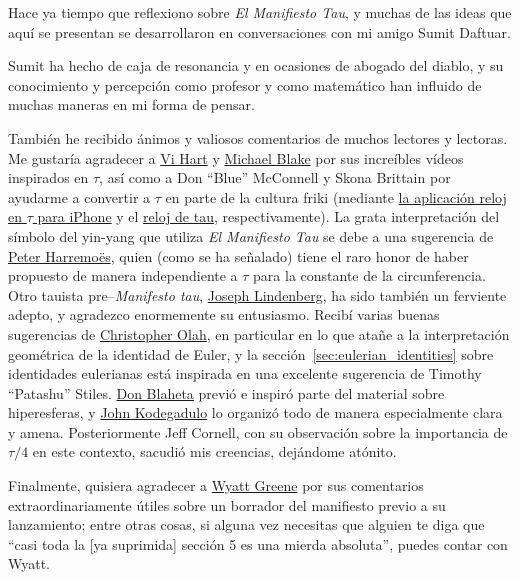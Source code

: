 Hace ya tiempo que reflexiono sobre \emph{El Manifiesto Tau}, y muchas de las ideas que aquí se presentan se desarrollaron en conversaciones con mi amigo Sumit Daftuar.

Sumit ha hecho de caja de resonancia y en ocasiones de abogado del diablo, y su conocimiento y percepción como profesor y como matemático han influido de muchas maneras en mi forma de pensar.

También he recibido ánimos y valiosos comentarios de muchos lectores y lectoras. Me gustaría agradecer a \href{http://www.youtube.com/watch?v=jG7vhMMXagQ}{Vi Hart} y \href{http://www.youtube.com/watch?v=3174T-3-59Q}{Michael Blake} por sus increíbles vídeos inspirados en $\tau$, así como a Don ``Blue'' McConnell y Skona Brittain por ayudarme a convertir a $\tau$ en parte de la cultura friki (mediante \href{http://tauclock.com/}{la aplicación reloj en $\tau$ para iPhone} y el \href{http://www.sbcrafts.net/clocks/}{reloj de tau}, respectivamente). La grata interpretación del símbolo del yin-yang que utiliza \emph{El Manifiesto Tau} se debe a una sugerencia de \href{http://www.harremoes.dk/Peter/}{Peter Harremo\"{e}s}, quien (como se ha señalado) tiene el raro honor de haber propuesto de manera independiente a $\tau$ para la constante de la circunferencia. Otro tauista pre--\emph{Manifesto tau}, \href{https://sites.google.com/site/taubeforeitwascool/}{Joseph Lindenberg}, ha sido también un ferviente adepto, y agradezco enormemente su entusiasmo. Recibí varias buenas sugerencias de \href{http://christopherolah.wordpress.com/about-me}{Christopher Olah}, en particular en lo que atañe a la interpretación geométrica de la identidad de Euler, y la sección~\ref{sec:eulerian_identities} sobre identidades eulerianas está inspirada en una excelente sugerencia de Timothy ``Patashu'' Stiles. \href{http://www.blahedo.org/blog/archives/001083.html}{Don Blaheta} previó e inspiró parte del material sobre hiperesferas, y \href{http://spikedmath.com/forum/viewtopic.php?f=30&t=147\#p1577}{John Kodegadulo} lo organizó todo de manera especialmente clara y amena. Posteriormente Jeff Cornell, con su observación sobre la importancia de $\tau/4$ en este contexto, sacudió mis creencias, dejándome atónito.

Finalmente, quisiera agradecer a \href{http://techiferous.com/about}{Wyatt Greene} por sus comentarios extraordinariamente útiles sobre un borrador del manifiesto previo a su lanzamiento; entre otras cosas, si alguna vez necesitas que alguien te diga que ``casi toda la [ya suprimida] sección 5 es una mierda absoluta'', puedes contar con Wyatt.


